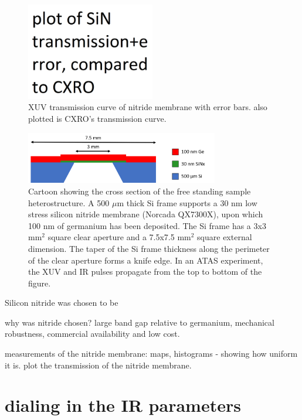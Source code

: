 \begin{figure}
	\centering
	\includegraphics[width=0.5\textwidth]{figures/chap3/Nitride_transmission.png}
	\caption{XUV transmission curve of nitride membrane with error bars. also plotted is CXRO's transmission curve.}
	\label{fig:Nitride_transmission}
\end{figure}

\begin{figure}
	\centering
	\includegraphics[width=0.75\textwidth]{figures/chap3/Sample_Geometry.png}
	\caption{Cartoon showing the cross section of the free standing sample heterostructure. A 500 $\mu$m thick Si frame supports a 30 nm low stress silicon nitride membrane (Norcada QX7300X), upon which 100 nm of germanium has been deposited. The Si frame has a 3x3 mm$^2$ square clear aperture and a 7.5x7.5 mm$^2$ square external dimension. The taper of the Si frame thickness along the perimeter of the clear aperture forms a knife edge. In an ATAS experiment, the XUV and IR pulses propagate from the top to bottom of the figure.}
	\label{fig:Sample_Geometry}
\end{figure}

Silicon nitride was chosen to be 

why was nitride chosen? large band gap relative to germanium, mechanical robustness, commercial availability and low cost.

measurements of the nitride membrane: maps, histograms - showing how uniform it is. plot the transmission of the nitride membrane.


\section{dialing in the IR parameters}

